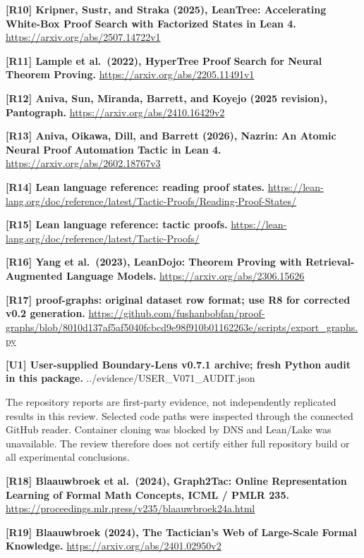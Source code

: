 \documentclass[
  10pt,
]{article}
\begin{document}
\textbf{{[}R10{]} Kripner, Sustr, and Straka (2025), LeanTree:
Accelerating White-Box Proof Search with Factorized States in Lean 4.}
\url{https://arxiv.org/abs/2507.14722v1}

\textbf{{[}R11{]} Lample et al.~(2022), HyperTree Proof Search for
Neural Theorem Proving.} \url{https://arxiv.org/abs/2205.11491v1}

\textbf{{[}R12{]} Aniva, Sun, Miranda, Barrett, and Koyejo (2025
revision), Pantograph.} \url{https://arxiv.org/abs/2410.16429v2}

\textbf{{[}R13{]} Aniva, Oikawa, Dill, and Barrett (2026), Nazrin: An
Atomic Neural Proof Automation Tactic in Lean 4.}
\url{https://arxiv.org/abs/2602.18767v3}

\textbf{{[}R14{]} Lean language reference: reading proof states.}
\url{https://lean-lang.org/doc/reference/latest/Tactic-Proofs/Reading-Proof-States/}

\textbf{{[}R15{]} Lean language reference: tactic proofs.}
\url{https://lean-lang.org/doc/reference/latest/Tactic-Proofs/}

\textbf{{[}R16{]} Yang et al.~(2023), LeanDojo: Theorem Proving with
Retrieval-Augmented Language Models.}
\url{https://arxiv.org/abs/2306.15626}

\textbf{{[}R17{]} proof-graphs: original dataset row format; use R8 for
corrected v0.2 generation.}
\url{https://github.com/fushanbobfan/proof-graphs/blob/8010d137af5af5040fcbcd9e98f910b01162263e/scripts/export_graphs.py}

\textbf{{[}U1{]} User-supplied Boundary-Lens v0.7.1 archive; fresh
Python audit in this package.} ../evidence/USER\_V071\_AUDIT.json

The repository reports are first-party evidence, not independently
replicated results in this review. Selected code paths were inspected
through the connected GitHub reader. Container cloning was blocked by
DNS and Lean/Lake was unavailable. The review therefore does not certify
either full repository build or all experimental conclusions.

\textbf{{[}R18{]} Blaauwbroek et al.~(2024), Graph2Tac: Online
Representation Learning of Formal Math Concepts, ICML / PMLR 235.}
\url{https://proceedings.mlr.press/v235/blaauwbroek24a.html}

\textbf{{[}R19{]} Blaauwbroek (2024), The Tactician's Web of Large-Scale
Formal Knowledge.} \url{https://arxiv.org/abs/2401.02950v2}
\end{document}
